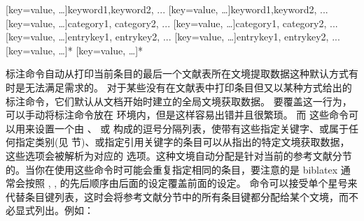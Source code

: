 \begin{ltxsyntax}

[key=value, \dots]{keyword1,keyword2, ...}
[key=value, \dots]{keyword1,keyword2, ...}
[key=value, \dots]{category1, category2, ...}
[key=value, \dots]{category1, category2, ...}
[key=value, \dots]{entrykey1, entrykey2, ...}
[key=value, \dots]{entrykey1, entrykey2, ...}
[key=value, \dots]{*}
[key=value, \dots]{*}

\end{ltxsyntax}
标注命令自动从打印当前条目的最后一个文献表所在文境提取数据这种默认方式有时是无法满足需求的。
对于某些没有在文献表中打印条目但又以某种方式给出的标注命令，它们默认从文档开始时建立的全局文境获取数据。
要覆盖这一行为，可以手动将标注命令放在  环境内，但是这样容易出错并且很繁琐。
而 这些命令可以用来设置一个由 、 或  构成的逗号分隔列表，使带有这些指定关键字、或属于任何指定类别(见  节)、或指定引用关键字的条目可以从指出的特定文境获取数据，这些选项会被解析为对应的  选项。这种文境自动分配是针对当前的参考文献分节的。当你在使用这些命令时可能会重复指定相同的条目，要注意的是 biblatex 通常会按照 , ,  的先后顺序由后面的设定覆盖前面的设定。
 命令可以接受单个星号来代替条目键列表，这时会将参考文献分节中的所有条目键都分配给某个文境，而不必显式列出。例如：


